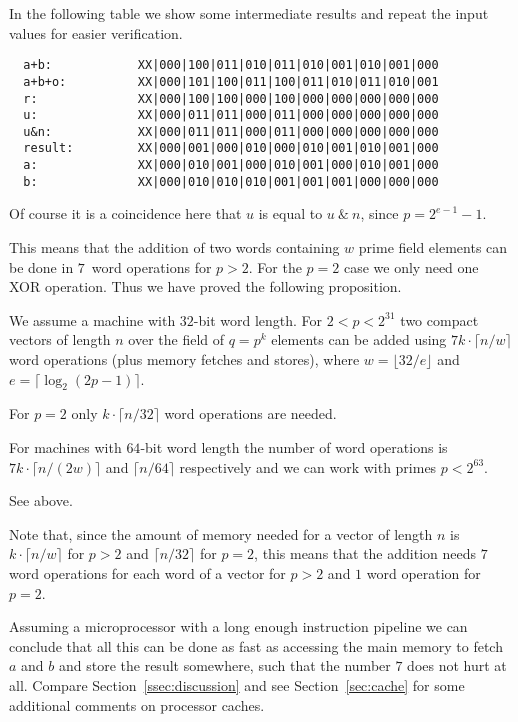 In the following table we show some intermediate results and repeat
the input values for easier verification.

\begin{verbatim}
  a+b:            XX|000|100|011|010|011|010|001|010|001|000
  a+b+o:          XX|000|101|100|011|100|011|010|011|010|001
  r:              XX|000|100|100|000|100|000|000|000|000|000
  u:              XX|000|011|011|000|011|000|000|000|000|000
  u&n:            XX|000|011|011|000|011|000|000|000|000|000
  result:         XX|000|001|000|010|000|010|001|010|001|000
  a:              XX|000|010|001|000|010|001|000|010|001|000
  b:              XX|000|010|010|010|001|001|001|000|000|000
\end{verbatim}

Of course it is a coincidence here that $u$ is equal to 
$u \ \&\ n$, since $p = 2^{e-1}-1$.

This means that the addition of two words containing $w$ prime field
elements can be done in $7$~word operations for $p > 2$. For the
$p=2$ case we only need one XOR operation. Thus we have proved the
following proposition.

\begin{Prop}
\label{addvec}
We assume a machine with $32$-bit word length. For\/ $2 < p < 2^{31}$
two compact vectors of length $n$ over the field of $q=p^k$
elements can be added using $7k\cdot \lceil n/w \rceil$ word operations
(plus memory fetches and stores), where $w = \lfloor 32/e \rfloor$
and $e = \lceil \log_2(2p-1) \rceil$. 

For $p=2$ only $k \cdot \lceil n/32 \rceil$ word operations are needed.

For machines with\/ $64$-bit word length the number of word operations
is\/ $7k \cdot \lceil n/(2w) \rceil$ and $\lceil n/64 \rceil$ respectively and 
we can work with primes $p < 2^{63}$.
\end{Prop}
\Proof See above. \ProofEnd

\begin{Rem}
Note that, since the amount of memory needed for a vector of length $n$
is $k \cdot \lceil n/w \rceil$ for $p > 2$ and $\lceil n/32 \rceil$ for
$p=2$, this means that the addition needs $7$ word operations for each
word of a vector for $p>2$ and $1$ word operation for $p=2$.

Assuming a microprocessor
with a long enough instruction pipeline we can conclude that all this
can be done as fast as accessing the main memory to fetch $a$ and $b$ and
store the result somewhere, such that the number $7$ does not hurt at all. 
Compare Section~\ref{ssec:discussion} and see Section~\ref{sec:cache}
for some additional comments on processor caches.
\end{Rem}

